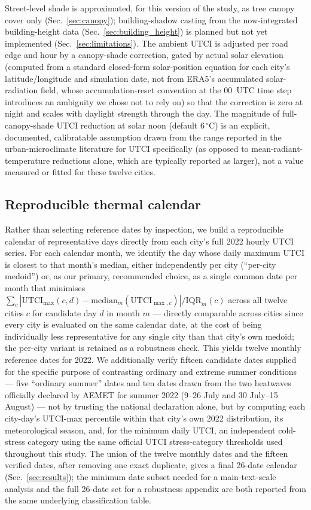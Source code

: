 \documentclass[pdflatex,sn-mathphys-ay]{sn-jnl}
\begin{document}
Street-level shade is approximated, for this version of the study, as tree
canopy cover only (Sec.~\ref{sec:canopy}); building-shadow casting from the
now-integrated building-height data (Sec.~\ref{sec:building_height}) is
planned but not yet implemented (Sec.~\ref{sec:limitations}). The ambient
UTCI is adjusted per road edge and hour by a canopy-shade correction, gated by
actual solar elevation (computed from a standard closed-form solar-position
equation for each city's latitude/longitude and simulation date, not from
ERA5's accumulated solar-radiation field, whose accumulation-reset convention
at the 00~UTC time step introduces an ambiguity we chose not to rely on) so
that the correction is zero at night and scales with daylight strength through
the day. The magnitude of full-canopy-shade UTCI reduction at solar noon
(default $6\,^\circ$C) is an explicit, documented, calibratable assumption
drawn from the range reported in the urban-microclimate literature for UTCI
specifically (as opposed to mean-radiant-temperature reductions alone, which
are typically reported as larger), not a value measured or fitted for these
twelve cities.

\subsection{Reproducible thermal calendar}
\label{sec:calendar}

Rather than selecting reference dates by inspection, we build a reproducible
calendar of representative days directly from each city's full 2022 hourly
UTCI series. For each calendar month, we identify the day whose daily maximum
UTCI is closest to that month's median, either independently per city
(``per-city medoid'') or, as our primary, recommended choice, as a single
common date per month that minimises
$\sum_c |\mathrm{UTCI}_{\max}(c,d) - \mathrm{median}_m(\mathrm{UTCI}_{\max,c})| / \mathrm{IQR}_m(c)$
across all twelve cities $c$ for candidate day $d$ in month $m$ --- directly
comparable across cities since every city is evaluated on the same calendar
date, at the cost of being individually less representative for any single
city than that city's own medoid; the per-city variant is retained as a
robustness check. This yields twelve monthly reference dates for 2022. We
additionally verify fifteen candidate dates supplied for the specific
purpose of contrasting ordinary and extreme summer conditions --- five
``ordinary summer'' dates and ten dates drawn from the two heatwaves
officially declared by AEMET for summer 2022 (9--26 July and 30 July--15
August) --- not by trusting the national declaration alone, but by computing
each city-day's UTCI-max percentile within that city's own 2022 distribution,
its meteorological season, and, for the minimum daily UTCI, an independent
cold-stress category using the same official UTCI stress-category thresholds
used throughout this study. The union of the twelve monthly dates and the
fifteen verified dates, after removing one exact duplicate, gives a final
26-date calendar (Sec.~\ref{sec:results}); the minimum date subset needed for
a main-text-scale analysis and the full 26-date set for a robustness
appendix are both reported from the same underlying classification table.
\end{document}
